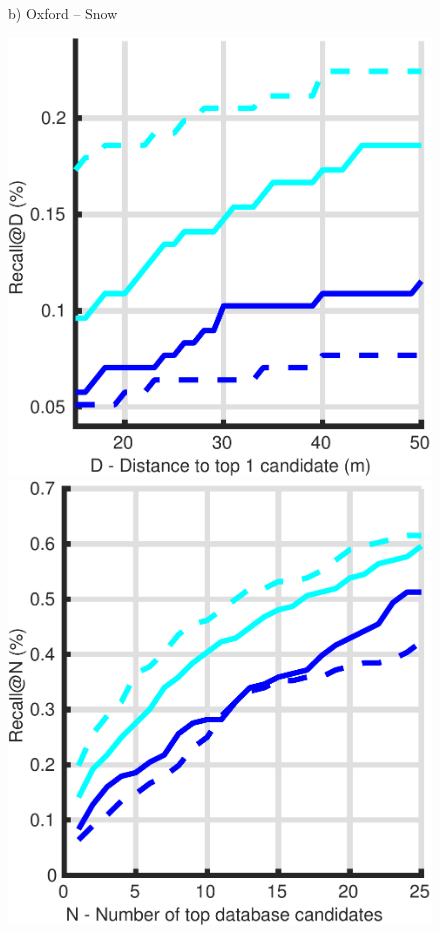 \begin{figure}
\begin{minipage}{0.27\linewidth}
		b) Oxford -- Snow
	\end{minipage}
	\begin{minipage}{0.27\linewidth}
		\center \scriptsize
		\includegraphics[width=\linewidth]{plot/night_ft/Results_night_queries/distance}	
		
		\includegraphics[width=\linewidth]{plot/night_ft/Results_night_queries/recall}
		

\end{minipage}
\end{figure}
